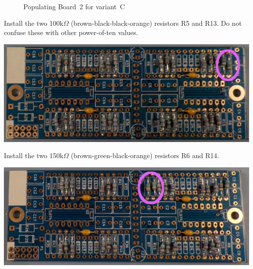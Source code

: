 \begin{figure}
\par
\caption{Populating Board~2 for variant~C}\label{fig:board-stuffing-2c}
\end{figure}

Install the two 100k$\Omega$ (brown-black-black-orange) resistors R5
and R13.  Do not confuse these with other power-of-ten values.

\noindent\includegraphics[width=\linewidth]{res-100kC.jpg}

Install the two 150k$\Omega$ (brown-green-black-orange) resistors R6
and R14.

\noindent\includegraphics[width=\linewidth]{res-150kC.jpg}

